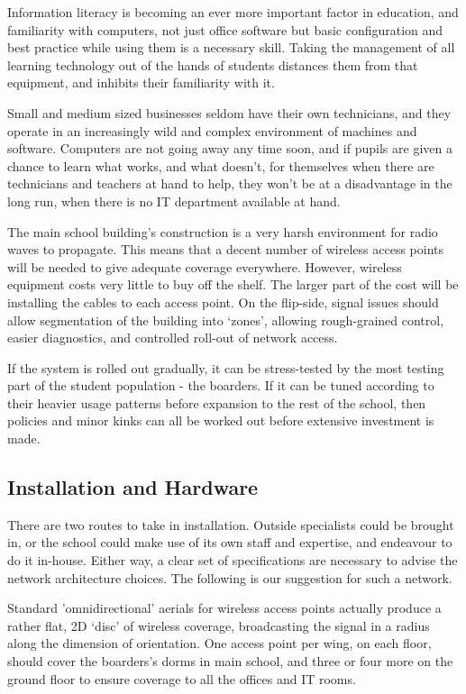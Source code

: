 \documentclass[a4paper,leqno,titlepage]{article}
\begin{document}
Information literacy is becoming an ever more important factor in education,
and familiarity with computers, not just office software but basic
configuration and best practice while using them is a necessary skill.
Taking the management of all learning technology out of the
hands of students distances them from that equipment, and inhibits their
familiarity with it.


Small and medium sized businesses seldom have their own
technicians, and they operate in an increasingly wild and complex environment
of machines and software.
Computers are not going away any time soon, and if pupils
are given a chance to learn what works, and what doesn't, for themselves when
there are technicians and teachers at hand to help,
they won't be at a disadvantage in the long run, when there is no IT department
available at hand.

The main school building's construction is a very harsh environment for radio
waves to propagate. This means that a decent number of wireless access points
will be needed to give adequate coverage everywhere. However, wireless equipment
costs very little to buy off the shelf. The larger part of the cost will be
installing the cables to each access point.
On the flip-side, signal issues should allow segmentation of the building
into `zones', allowing rough-grained control, easier diagnostics, and
controlled roll-out of network access.


If the system is rolled out gradually, it can be
stress-tested by the most testing part of the student population - the boarders.
If it can be tuned according to their heavier usage patterns before expansion to
the rest of the school, then policies and minor kinks can all be worked out
before extensive investment is made.


\subsection{Installation and Hardware}

There are two routes to take in installation.
Outside specialists could be brought in, or the
school could make use of its own staff and expertise,
and endeavour to do it in-house.
Either way, a clear set of specifications are necessary to advise the network
architecture choices. The following is our suggestion for such a network.


Standard 'omnidirectional' aerials for wireless access points
actually produce a rather flat, 2D `disc' of wireless coverage, broadcasting
the signal in a radius along the dimension of orientation.
One access point per wing, on each floor, should cover the boarders's
dorms in main school, and three or four more on the ground floor to ensure
coverage to all the offices and IT rooms.
\end{document}

